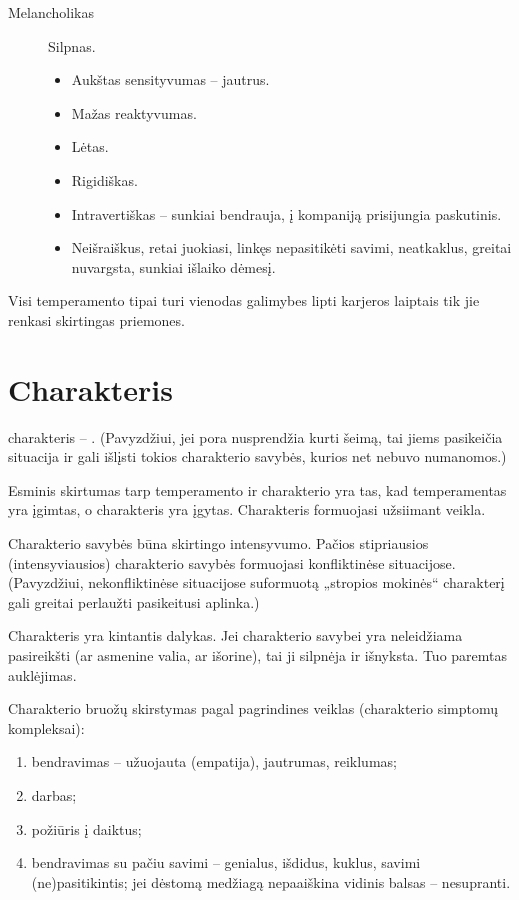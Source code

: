 \begin{description}
\begin{itemize}
    \end{itemize}
  \item[Melancholikas] Silpnas.
    \begin{itemize}
      \item Aukštas sensityvumas – jautrus.
      \item Mažas reaktyvumas.
      \item Lėtas.
      \item Rigidiškas.
      \item Intravertiškas – sunkiai bendrauja, į kompaniją prisijungia
        paskutinis.
      \item Neišraiškus, retai juokiasi, linkęs nepasitikėti savimi, 
        neatkaklus, greitai nuvargsta, sunkiai išlaiko dėmesį.
    \end{itemize}
\end{description}

Visi temperamento tipai turi vienodas galimybes lipti karjeros laiptais tik
jie renkasi skirtingas priemones.

\section{Charakteris}

\Gls{charakteris} – . (Pavyzdžiui, jei pora
nusprendžia kurti šeimą, tai jiems pasikeičia situacija ir gali išlįsti
tokios charakterio savybės, kurios net nebuvo numanomos.)

Esminis skirtumas tarp temperamento ir charakterio yra tas, kad 
temperamentas yra įgimtas, o charakteris yra įgytas. Charakteris formuojasi
užsiimant veikla.

Charakterio savybės būna skirtingo intensyvumo. Pačios stipriausios
(intensyviausios) charakterio savybės formuojasi konfliktinėse situacijose.
(Pavyzdžiui, nekonfliktinėse situacijose suformuotą „stropios mokinės“ 
charakterį gali greitai perlaužti pasikeitusi aplinka.)

Charakteris yra kintantis dalykas. Jei charakterio savybei yra neleidžiama
pasireikšti (ar asmenine valia, ar išorine), tai ji silpnėja ir išnyksta.
Tuo paremtas auklėjimas.

Charakterio bruožų skirstymas pagal pagrindines veiklas (charakterio
simptomų kompleksai):

\begin{enumerate}
  \item bendravimas – užuojauta (empatija), jautrumas, reiklumas;
  \item darbas;
  \item požiūris į daiktus;
  \item bendravimas su pačiu savimi – genialus, išdidus, kuklus, savimi
    (ne)pasitikintis; jei dėstomą medžiagą nepaaiškina vidinis balsas –
    nesupranti.
\end{enumerate}

